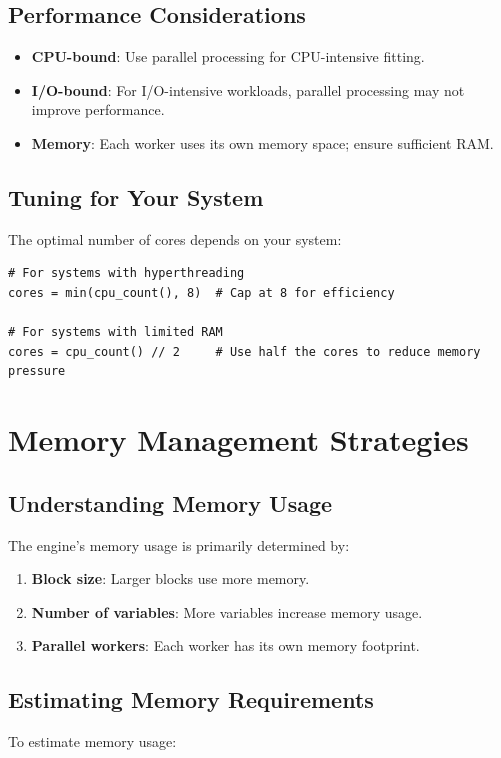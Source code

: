 ﻿\documentclass[12pt,a4paper]{report}
\begin{document}
\subsection{Performance Considerations}
\begin{itemize}
    \item \textbf{CPU-bound}: Use parallel processing for CPU-intensive fitting.
    \item \textbf{I/O-bound}: For I/O-intensive workloads, parallel processing may not improve performance.
    \item \textbf{Memory}: Each worker uses its own memory space; ensure sufficient RAM.
\end{itemize}

\subsection{Tuning for Your System}
The optimal number of cores depends on your system:

\begin{lstlisting}[caption=Choosing the Number of Cores]
# For systems with hyperthreading
cores = min(cpu_count(), 8)  # Cap at 8 for efficiency

# For systems with limited RAM
cores = cpu_count() // 2     # Use half the cores to reduce memory pressure
\end{lstlisting}

\section{Memory Management Strategies}

\subsection{Understanding Memory Usage}
The engine's memory usage is primarily determined by:
\begin{enumerate}
    \item \textbf{Block size}: Larger blocks use more memory.
    \item \textbf{Number of variables}: More variables increase memory usage.
    \item \textbf{Parallel workers}: Each worker has its own memory footprint.
\end{enumerate}

\subsection{Estimating Memory Requirements}
To estimate memory usage:
\end{document}
